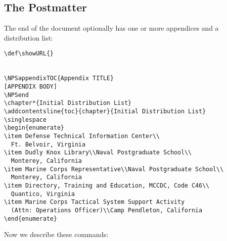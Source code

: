 \subsection{The Postmatter}
The end of the document optionally has one or more appendices and a distribution list:
\begin{Verbatim}[fontsize=\small]
\def\showURL{}


\NPSappendixTOC{Appendix TITLE}
[APPENDIX BODY]
\NPSend         
\chapter*{Initial Distribution List}
\addcontentsline{toc}{chapter}{Initial Distribution List}
\singlespace
\begin{enumerate}
\item Defense Technical Information Center\\
  Ft. Belvoir, Virginia
\item Dudly Knox Library\\Naval Postgraduate School\\
  Monterey, California
\item Marine Corps Representative\\Naval Postgraduate School\\
  Monterey, California
\item Directory, Training and Education, MCCDC, Code C46\\
  Quantico, Virginia
\item Marine Corps Tactical System Support Activity 
  (Attn: Operations Officer)\\Camp Pendleton, California
\end{enumerate}

\end{Verbatim}

Now we describe these commands:


